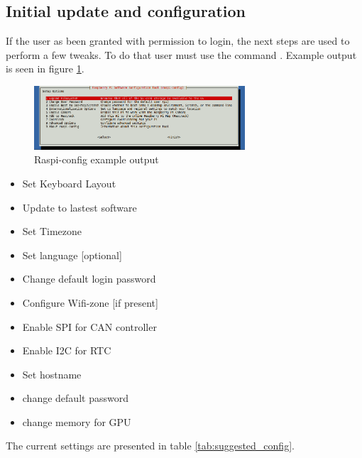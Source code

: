 \subsection{Initial update and configuration}
If the user as been granted with permission to login, the next steps are used to perform a few tweaks.
To do that user must use the command . Example output is seen in figure \ref{fig:raspi_config}.

\begin{figure}[hb]
	\centering
	\includegraphics[width=0.7\textwidth]{figures/raspi-config}
	\caption{Raspi-config example output}
	\label{fig:raspi_config}
\end{figure}

\begin{itemize}
	\tightlist
	\item Set Keyboard Layout
	\item Update to lastest software
	\item Set Timezone
	\item Set language [optional]
	\item Change default login password
	\item Configure Wifi-zone [if present]
	\item Enable \gls{SPI} for \gls{CAN} controller
	\item Enable \gls{I2C} for RTC
	\item Set hostname
	\item change default password
	\item change memory for GPU
\end{itemize}



The current settings are presented in table \ref{tab:suggested_config}. 

